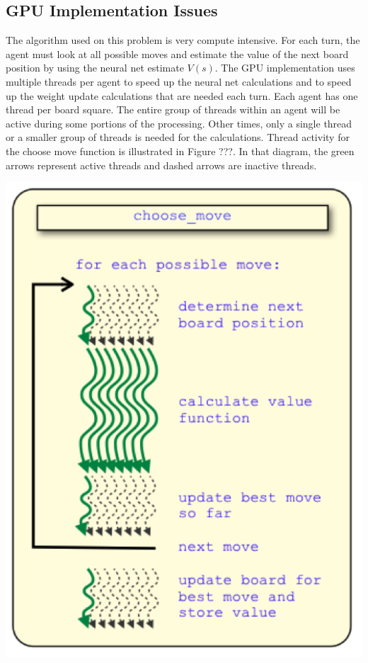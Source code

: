 \documentclass[11pt]{article} %
\begin{document}
\begin{flushleft}


\subsection{GPU Implementation Issues}
The algorithm used on this problem is very compute intensive.  For each turn, the agent must look at all possible moves and estimate the value of the next board position by using the neural net estimate $V(s)$.  The GPU implementation uses multiple threads per agent to speed up the neural net calculations and to speed up the weight update calculations that are needed each turn.  Each agent has one thread per board square.  The entire group of threads within an agent will be active during some portions of the processing.  Other times, only a single thread or a smaller group of threads is needed for the calculations.  Thread activity for the choose move function is illustrated in Figure ???.  In that diagram, the green arrows represent active threads and dashed arrows are inactive threads.

\end{flushleft}
\center
\includegraphics[scale=0.8]{fig14}
\end{document}
